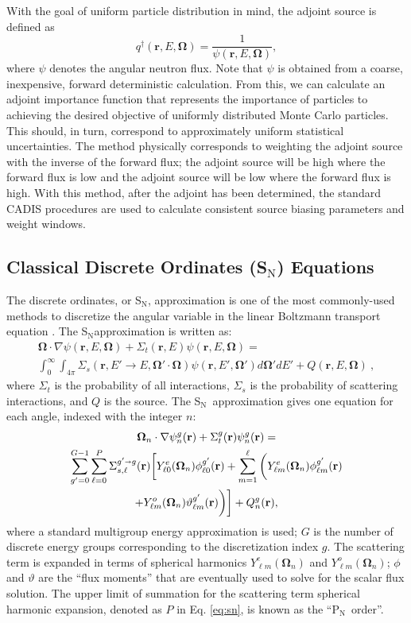 \documentclass{article} %
\newcommand{\bo}{\mathbf\Omega}
\newcommand{\vecr}{\textbf{r}}
\newcommand{\sn}{S$_\mathrm{N}$}
\newcommand{\pn}{P$_\mathrm{N}$}
\newcommand{\Ye}[2]{\ensuremath{Y^e_{#1}(\bo_#2)}}
\newcommand{\Yo}[2]{\ensuremath{Y^o_{#1}(\bo_#2)}}
\newcommand{\sa}{\shortrightarrow}
\begin{document}
With the goal of uniform particle distribution in mind, the adjoint source is
defined as
%
\begin{equation}
q^{\dagger}(\vecr,E,\bo) = \frac{1}{\psi(\vecr,E,\bo)},
\end{equation}
%
where $\psi$ denotes the angular neutron flux. Note that $\psi$ is obtained
from a coarse, inexpensive, forward deterministic calculation. From this, we
can calculate an adjoint importance function that represents the importance of
particles to achieving the desired objective of uniformly distributed Monte
Carlo particles. This should, in turn, correspond to approximately uniform
statistical uncertainties. The method physically corresponds to weighting the
adjoint source with the inverse of the forward flux; the adjoint source will
be high where the forward flux is low and the adjoint source will be low where
the forward flux is high. With this method, after the adjoint has been
determined, the standard CADIS procedures are used to calculate consistent
source biasing parameters and weight windows.

\subsection{Classical Discrete Ordinates (\sn) Equations}

The discrete ordinates, or \sn, approximation is one of the most commonly-used
methods to discretize the angular variable in the linear Boltzmann
transport equation \cite{bg}. The \sn approximation is written as:
%
\begin{multline}
\bo \cdot \nabla \psi(\vecr,E,\bo) + \Sigma_t(\vecr,E) \psi(\vecr,E,\bo) = \\
\int_0^\infty\int_{4\pi} \Sigma_s(\vecr,E'\rightarrow E,\bo'\cdot\bo)
\psi(\vecr,E',\bo')d\bo'dE' + Q(\vecr,E,\bo) \:,
\label{eq:bte}
\end{multline}
%
where $\Sigma_t$ is the probability of all interactions, $\Sigma_s$ is the
probability of scattering interactions, and $Q$ is the source. The \sn\
approximation gives one equation for each angle, indexed with the integer $n$:
%
\begin{multline}
\bo_n \cdot \nabla \psi_n^g(\vecr) + \Sigma_t^g(\vecr)\psi_n^g(\vecr) = \\
\sum_{g'=0}^{G-1}\sum_{\ell=0}^{P}\Sigma_{s,\ell}^{g'\sa g}(\vecr)
\bigg[\Ye{\ell 0}{n}\phi_{\ell 0}^{g'}(\vecr) + \sum_{m=1}^{\ell}
\bigg(\Ye{\ell m}{n}\phi_{\ell m}^{g'}(\vecr) \\
 + \Yo{\ell m}{n}\vartheta_{\ell m}^{g'}(\vecr)\bigg)\bigg]
+ Q_n^g(\vecr),
\label{eq:sn}
\end{multline}
%
where a standard multigroup energy approximation is used; $G$ is the
number of discrete energy groups corresponding to the discretization index
$g$. The scattering term is expanded in terms of spherical harmonics
$\Ye{\ell m}{n}$ and $\Yo{\ell m}{n}$; $\phi$ and $\vartheta$ are the
``flux moments'' that are eventually used to solve for the scalar flux
solution. The upper limit of summation for the scattering term spherical
harmonic expansion, denoted as $P$ in Eq. \eqref{eq:sn}, is known as the
``\pn\ order''.
\end{document}
